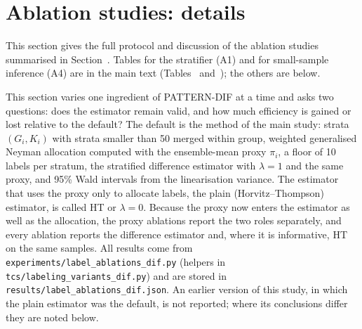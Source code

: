 \section{Ablation studies: details}\label{si:ablations}

This section gives the full protocol and discussion of the ablation studies summarised in Section~. Tables for the stratifier (A1) and for small-sample inference (A4) are in the main text (Tables~ and~); the others are below.

This section varies one ingredient of PATTERN-DIF at a time and asks two questions: does the estimator remain valid, and how much efficiency is gained or lost relative to the default? The default is the method of the main study: strata $(G_i,K_i)$ with strata smaller than 50 merged within group, weighted generalised Neyman allocation \citep{neyman1934} computed with the ensemble-mean proxy $\pi_i$, a floor of 10 labels per stratum, the stratified difference estimator with $\lambda=1$ and the same proxy, and 95\% Wald intervals from the linearisation variance. The estimator that uses the proxy only to allocate labels, the plain (Horvitz--Thompson) estimator, is called HT or $\lambda=0$. Because the proxy now enters the estimator as well as the allocation, the proxy ablations report the two roles separately, and every ablation reports the difference estimator and, where it is informative, HT on the same samples. All results come from \texttt{experiments/label\_ablations\_dif.py} (helpers in \texttt{tcs/labeling\_variants\_dif.py}) and are stored in \texttt{results/label\_ablations\_dif.json}. An earlier version of this study, in which the plain estimator was the default, is not reported; where its conclusions differ they are noted below.

